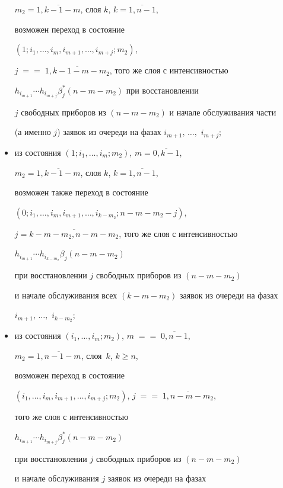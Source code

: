 \begin{multicols}{2}
\begin{itemize}
$m_2=\overline{1,k-1-m}$, слоя $k$, $k=\overline{1,n-1}$,


возможен переход в состояние


$(1;i_1,\ldots,i_{m},i_{m+1},\ldots,i_{m+j};m_2)$,


$j\;=$\linebreak $=\;\overline{1,k-1-m-m_2}$, того же слоя с интенсивностью


$h_{i_{m+1}}\cdots h_{i_{m+j}}\beta^*_j(n-m-m_2)$ при вос\-ста\-нов\-ле\-нии


$j$ свободных приборов из $(n-m-m_2)$ и начале обслуживания части


(а именно $j$) заявок из очереди на фазах $i_{m+1},\,\ldots,$ $i_{m+j}$;


\item


из состояния $(1;i_1,\ldots,i_m;m_2)$, $m=\overline{0,k-1}$,


$m_2=\overline{1,k-1-m}$, слоя $k$, $k=\overline{1,n-1}$,


возможен также переход в состояние


$(0;i_1,\ldots,i_{m},i_{m+1},\ldots,i_{k-m_2};n-m-m_2-j)$,


$j=\overline{k-m-m_2,n-m-m_2}$, того же слоя с интенсивностью


$h_{i_{m+1}}\cdots h_{i_{k-m_2}}\beta_j(n-m-m_2)$


при восстановлении $j$ свободных приборов из $(n-m-m_2)$


и начале обслуживания всех $(k-m-m_2)$ заявок из очереди на фазах


$i_{m+1},\,\ldots,$ $i_{k-m_2}$;


\item


 из состояния $(i_1,\ldots,i_m;m_2)$, $m\;=$\linebreak $=\;\overline{0,n-1}$,


$m_2=\overline{1,n-1-m}$, слоя~$k$, $k\ge n$,


возможен переход в состояние


$(i_1,\ldots,i_{m},i_{m+1},\ldots,i_{m+j};m_2)$, $j\;=$\linebreak $=\;\overline{1,n-m-m_2}$,


того же слоя с ин\-тен\-сив\-ностью


$h_{i_{m+1}}\cdots h_{i_{m+j}}\beta^*_j(n-m-m_2)$


при восстановлении $j$ свободных приборов из $(n-m-m_2)$


и начале обслуживания $j$ заявок из очереди на фазах



\end{itemize}
\end{multicols}
